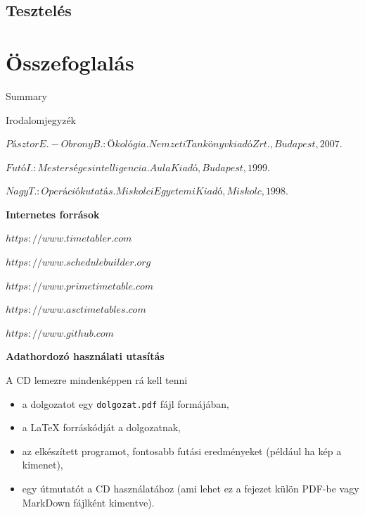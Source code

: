 \documentclass[12pt,a4paper]{report}
\begin{document}
\section{Tesztelés}

\newpage

\chapter{Összefoglalás}

\newpage

\huge{Summary}

\newpage

\clearpage




\huge{Irodalomjegyzék}

\noindent [1]\quad $Pásztor E. - Obrony B.: Ökológia. Nemzeti Tankönyvkiadó Zrt., Budapest, 2007.$

\noindent [2]\quad $Futó I.: Mesterséges intelligencia. Aula Kiadó, Budapest, 1999.$

\noindent [3]\quad $Nagy T.: Operációkutatás. Miskolci Egyetemi Kiadó, Miskolc, 1998.$

\textbf{Internetes források}

\noindent [4]\quad $https://www.timetabler.com$

\noindent [5]\quad $https://www.schedulebuilder.org$

\noindent [6]\quad $https://www.primetimetable.com$

\noindent [7]\quad $https://www.asctimetables.com$

\noindent [8]\quad $https://www.github.com$

\newpage

\pagestyle{empty}

\noindent \textbf{\Large Adathordozó használati utasítás}

\vskip 1cm

A CD lemezre mindenképpen rá kell tenni
\begin{itemize}
\item a dolgozatot egy \texttt{dolgozat.pdf} fájl formájában,
\item a LaTeX forráskódját a dolgozatnak,
\item az elkészített programot, fontosabb futási eredményeket (például ha kép a kimenet),
\item egy útmutatót a CD használatához (ami lehet ez a fejezet külön PDF-be vagy MarkDown fájlként kimentve).
\end{itemize}
\end{document}
